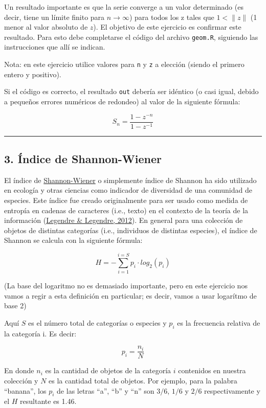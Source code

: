 \documentclass[]{article}
\begin{document}
Un resultado importante es que la serie converge a un valor determinado
(es decir, tiene un límite finito para $n \to \infty$) para todos los z
tales que $1 < \|z\|$ (1 menor al valor absoluto de $z$). El objetivo de
este ejercicio es confirmar este resultado. Para esto debe completarse
el código del archivo \texttt{geom.R}, siguiendo las instrucciones que
allí se indican.

Nota: en este ejercicio utilice valores para \texttt{n} y \texttt{z} a
elección (siendo el primero entero y positivo).

Si el código es correcto, el resultado \texttt{out} debería ser idéntico
(o casi igual, debido a pequeños errores numéricos de redondeo) al valor
de la siguiente fórmula:

\[
  S_n = \frac{1 - z ^ {- n}}{1 - z ^ {-1}}
\]

\begin{center}\rule{3in}{0.4pt}\end{center}

\subsection{3. Índice de Shannon-Wiener}

El índice de
\href{https://es.wikipedia.org/wiki/\%C3\%8Dndice\_de\_Shannon}{Shannon-Wiener}
o simplemente índice de Shannon ha sido utilizado en ecología y otras
ciencias como indicador de diversidad de una comunidad de especies. Este
índice fue creado originalmente para ser usado como medida de entropía
en cadenas de caracteres (i.e., texto) en el contexto de la teoría de la
información (\href{http://www.amazon.com/dp/0444538682}{Legendre \&
Legendre, 2012}). En general para una colección de objetos de distintas
categorías (i.e., individuos de distintas especies), el índice de
Shannon se calcula con la siguiente fórmula:

\[
  H = - \sum_{i=1}^{i=S} p_i \cdot log_2 (p_i)
\]

(La base del logaritmo no es demasiado importante, pero en este
ejercicio nos vamos a regir a esta definición en particular; es decir,
vamos a usar logarítmo de base 2)

Aquí $S$ es el número total de categorías o especies y $p_i$ es la
frecuencia relativa de la categoría i. Es decir:

\[
  p_i = \frac{n_i}{N}
\]

En donde $n_i$ es la cantidad de objetos de la categoría $i$ contenidos
en nuestra colección y $N$ es la cantidad total de objetos. Por ejemplo,
para la palabra ``banana'', los $p_i$ de las letras ``a'', ``b'' y ``n''
son $3/6$, $1/6$ y $2/6$ respectivamente y el $H$ resultante es 1.46.
\end{document}
